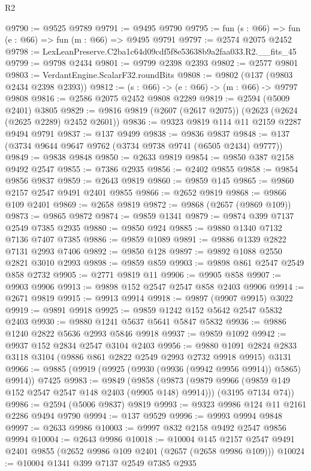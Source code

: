 \begin{lexlean}{R2}
\begin{coremodule}
@9790 := @9525 @9789
@9791 := @9495 @9790
@9795 := fun (s : @66) => fun (e : @66) => fun (m : @66) => @9495 @9791
@9797 := @2574 @2075 @2452
@9798 := LexLeanPreserve.C2ba1c64d09cdf5f8e53638b9a2faa033.R2.__fits_45
@9799 := @9798 @2434
@9801 := @9799 @2398 @2393
@9802 := @2577 @9801
@9803 := VerdantEngine.ScalarF32.roundBits
@9808 := @9802 (@137 (@9803 @2434 @2398 @2393))
@9812 := (s : @66) -> (e : @66) -> (m : @66) -> @9797 @9808
@9816 := @2586 @2075 @2452 @9808 @2289
@9819 := @2594 (@5009 @2401) @3805
@9829 := @9816 @9819 (@2607 (@2617 @2075)) (@2623 (@2624 (@2625 @2289) @2452 @2601))
@9836 := @9323 @9819 @114 @11 @2159 @2287 @9494 @9791
@9837 := @137 @9499
@9838 := @9836 @9837
@9848 := @137 (@3734 @9644 @9647 @9762 (@3734 @9738 @9741 (@6505 @2434) @9777))
@9849 := @9838 @9848
@9850 := @2633 @9819
@9854 := @9850 @387 @2158 @9492 @2547
@9855 := @7386 @2935
@9856 := @2402 @9855
@9858 := @9854 @9856 @9837
@9859 := @2643 @9819
@9860 := @9859 @145
@9865 := @9860 @2157 @2547 @9491 @2401 @9855
@9866 := @2652 @9819
@9868 := @9866 @109 @2401
@9869 := @2658 @9819
@9872 := @9868 (@2657 (@9869 @109))
@9873 := @9865 @9872
@9874 := @9859 @1341
@9879 := @9874 @399 @7137 @2549 @7385 @2935
@9880 := @9850 @924
@9885 := @9880 @1340 @7132 @7136 @7407 @7385
@9886 := @9859 @1089
@9891 := @9886 @1339 @2822 @7131 @2993 @7406
@9892 := @9850 @128
@9897 := @9892 @1088 @2550 @2821 @3010 @2993
@9898 := @9859 @859
@9903 := @9898 @861 @2547 @2549 @858 @2732
@9905 := @2771 @9819 @11
@9906 := @9905 @858
@9907 := @9903 @9906
@9913 := @9898 @152 @2547 @2547 @858 @2403 @9906
@9914 := @2671 @9819
@9915 := @9913 @9914
@9918 := @9897 (@9907 @9915) @3022
@9919 := @9891 @9918
@9925 := @9859 @1242 @152 @5642 @2547 @5832 @2403
@9930 := @9880 @1241 @5637 @5641 @5847 @5832
@9936 := @9886 @1240 @2822 @5636 @2993 @5846 @9918
@9937 := @9859 @1092
@9942 := @9937 @152 @2834 @2547 @3104 @2403
@9956 := @9880 @1091 @2824 @2833 @3118 @3104 (@9886 @861 @2822 @2549 @2993 @2732 @9918 @9915) @3131
@9966 := @9885 (@9919 (@9925 (@9930 (@9936 (@9942 @9956 @9914)) @5865) @9914)) @7425
@9983 := @9849
    (@9858
      (@9873 (@9879 @9966 (@9859 @149 @152 @2547 @2547 @148 @2403 (@9905 @148) @9914)))
      (@3195 @7134 @74))
@9986 := @2594 (@5006 @9837) @9819
@9993 := @9323 @9986 @124 @11 @2161 @2286 @9494 @9790
@9994 := @137 @9529
@9996 := @9993 @9994 @9848
@9997 := @2633 @9986
@10003 := @9997 @832 @2158 @9492 @2547 @9856 @9994
@10004 := @2643 @9986
@10018 := @10004
    @145
    @2157
    @2547
    @9491
    @2401
    @9855
    (@2652 @9986 @109 @2401 (@2657 (@2658 @9986 @109)))
@10024 := @10004 @1341 @399 @7137 @2549 @7385 @2935

\end{coremodule}
\end{lexlean}
